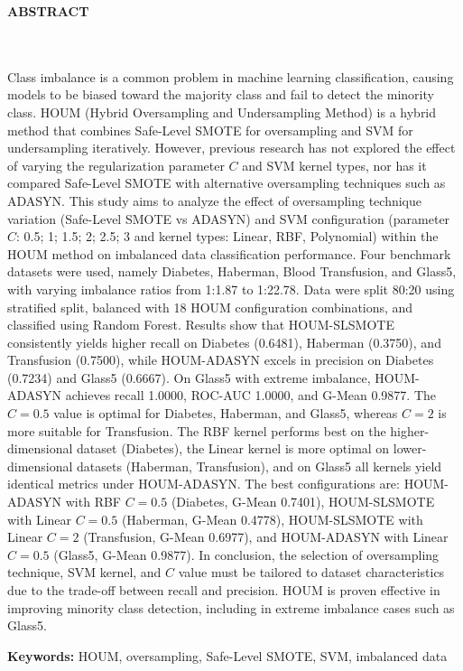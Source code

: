 \clearpage
{}%
\thispagestyle{fancy}

\begin{center}
	\large \bfseries \MakeUppercase{Abstract}\\
	\normalsize \normalfont {\thetitleEN}\\
	\normalsize \normalfont {\theauthor}\\
	\bigskip
	
	\normalsize \normalfont \justifying \singlespacing
	Class imbalance is a common problem in machine learning classification, causing models to be biased toward the majority class and fail to detect the minority class. HOUM (Hybrid Oversampling and Undersampling Method) is a hybrid method that combines Safe-Level SMOTE for oversampling and SVM for undersampling iteratively. However, previous research has not explored the effect of varying the regularization parameter $C$ and SVM kernel types, nor has it compared Safe-Level SMOTE with alternative oversampling techniques such as ADASYN. This study aims to analyze the effect of oversampling technique variation (Safe-Level SMOTE vs ADASYN) and SVM configuration (parameter $C$: 0.5; 1; 1.5; 2; 2.5; 3 and kernel types: Linear, RBF, Polynomial) within the HOUM method on imbalanced data classification performance. Four benchmark datasets were used, namely Diabetes, Haberman, Blood Transfusion, and Glass5, with varying imbalance ratios from 1:1.87 to 1:22.78. Data were split 80:20 using stratified split, balanced with 18 HOUM configuration combinations, and classified using Random Forest. Results show that HOUM-SLSMOTE consistently yields higher recall on Diabetes (0.6481), Haberman (0.3750), and Transfusion (0.7500), while HOUM-ADASYN excels in precision on Diabetes (0.7234) and Glass5 (0.6667). On Glass5 with extreme imbalance, HOUM-ADASYN achieves recall 1.0000, ROC-AUC 1.0000, and G-Mean 0.9877. The $C=0.5$ value is optimal for Diabetes, Haberman, and Glass5, whereas $C=2$ is more suitable for Transfusion. The RBF kernel performs best on the higher-dimensional dataset (Diabetes), the Linear kernel is more optimal on lower-dimensional datasets (Haberman, Transfusion), and on Glass5 all kernels yield identical metrics under HOUM-ADASYN. The best configurations are: HOUM-ADASYN with RBF $C=0.5$ (Diabetes, G-Mean 0.7401), HOUM-SLSMOTE with Linear $C=0.5$ (Haberman, G-Mean 0.4778), HOUM-SLSMOTE with Linear $C=2$ (Transfusion, G-Mean 0.6977), and HOUM-ADASYN with Linear $C=0.5$ (Glass5, G-Mean 0.9877). In conclusion, the selection of oversampling technique, SVM kernel, and $C$ value must be tailored to dataset characteristics due to the trade-off between recall and precision. HOUM is proven effective in improving minority class detection, including in extreme imbalance cases such as Glass5.
    
    \vspace{20pt}
	\raggedright\textbf{Keywords:} HOUM, oversampling, Safe-Level SMOTE, SVM, imbalanced data
	
	\vfill
	
\end{center}
\clearpage
